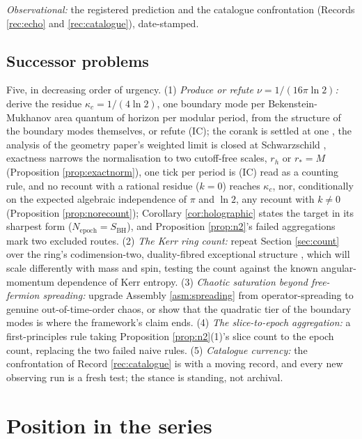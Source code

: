 \documentclass[11pt]{article}
\theoremstyle{definition}
\newcommand{\SBH}{S_{\mathrm{BH}}}
\begin{document}
\emph{Observational:} the registered prediction and the catalogue confrontation (Records \ref{rec:echo} and \ref{rec:catalogue}), date-stamped.

\subsection*{Successor problems}

Five, in decreasing order of urgency. (1) \emph{Produce or refute $\nu = 1/(16\pi\ln 2)$:} derive the residue $\kappa_c = 1/(4\ln 2)$, one boundary mode per Bekenstein-Mukhanov area quantum of horizon per modular period, from the structure of the boundary modes themselves, or refute (IC); the corank is settled at one \cite[\S 8.9]{ButlerT4}, the analysis of the geometry paper's weighted limit is closed at Schwarzschild \cite[\S 5.5]{ButlerT6}, exactness narrows the normalisation to two cutoff-free scales, $r_h$ or $r_* = M$ (Proposition \ref{prop:exactnorm}), one tick per period is (IC) read as a counting rule, and no recount with a rational residue ($k = 0$) reaches $\kappa_c$, nor, conditionally on the expected algebraic independence of $\pi$ and $\ln 2$, any recount with $k \neq 0$ (Proposition \ref{prop:norecount}); Corollary \ref{cor:holographic} states the target in its sharpest form ($N_{\mathrm{epoch}} = \SBH$), and Proposition \ref{prop:n2}'s failed aggregations mark two excluded routes. (2) \emph{The Kerr ring count:} repeat Section \ref{sec:count} over the ring's codimension-two, duality-fibred exceptional structure \cite[Conj.~6.6]{ButlerT6}, which will scale differently with mass and spin, testing the count against the known angular-momentum dependence of Kerr entropy. (3) \emph{Chaotic saturation beyond free-fermion spreading:} upgrade Assembly \ref{asm:spreading} from operator-spreading to genuine out-of-time-order chaos, or show that the quadratic tier of the boundary modes is where the framework's claim ends. (4) \emph{The slice-to-epoch aggregation:} a first-principles rule taking Proposition \ref{prop:n2}(1)'s slice count to the epoch count, replacing the two failed naive rules. (5) \emph{Catalogue currency:} the confrontation of Record \ref{rec:catalogue} is with a moving record, and every new observing run is a fresh test; the stance is standing, not archival.

\section{Position in the series}\label{sec:position}
\end{document}
